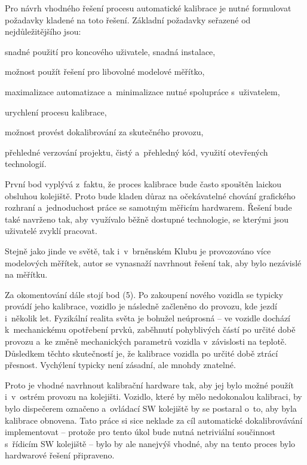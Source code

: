 Pro návrh vhodného řešení procesu automatické kalibrace je nutné formulovat
požadavky kladené na toto řešení. Základní požadavky seřazené od
nejdůležitějšího jsou:

\begin{compactenum}
	\item snadné použití pro koncového uživatele, snadná instalace,
	\item možnost použít řešení pro libovolné modelové měřítko,
	\item maximalizace automatizace a~minimalizace nutné spolupráce s~uživatelem,
	\item urychlení procesu kalibrace,
	\item možnost provést dokalibrování za skutečného provozu,
	\item přehledné verzování projektu, čistý a~přehledný kód, využití
	otevřených technologií.
\end{compactenum}

První bod vyplývá z~faktu, že proces kalibrace bude často spouštěn laickou
obsluhou kolejiště. Proto bude kladen důraz na očekávatelné chování grafického
rozhraní a~jednoduchost práce se samotným měřicím hardwarem. Řešení bude také
navrženo tak, aby využívalo běžně dostupné technologie, se kterými jsou
uživatelé zvyklí pracovat.

Stejně jako jinde ve světě, tak i~v~brněnském Klubu je provozováno více
modelových měřítek, autor se vynasnaží navrhnout řešení tak, aby bylo nezávislé
na měřítku.

Za okomentování dále stojí bod (5). Po zakoupení nového vozidla se typicky
provádí jeho kalibrace, vozidlo je následně začleněno do provozu, kde jezdí
i~několik let. Fyzikální realita světa je bohužel neúprosná -- ve vozidle
dochází k~mechanickému opotřebení prvků, zaběhnutí pohyblivých částí po určité
době provozu a~ke změně mechanických parametrů vozidla v~závislosti na teplotě.
Důsledkem těchto skutečností je, že kalibrace vozidla po určité době ztrácí
přesnost. Vychýlení typicky není zásadní, ale mnohdy znatelné.

Proto je vhodné navrhnout kalibrační hardware tak, aby jej bylo možné použít
i~v~ostrém provozu na kolejišti. Vozidlo, které by mělo nedokonalou kalibraci,
by bylo dispečerem označeno a~ovládací SW kolejiště by se postaral o~to, aby
byla kalibrace obnovena. Tato práce si sice neklade za cíl automatické
dokalibrovávání implementovat -- protože pro tento úkol bude nutná netriviální
součinnost s~řídicím SW kolejiště -- bylo by ale nanejvýš vhodné, aby na tento
proces bylo hardwarové řešení připraveno.
